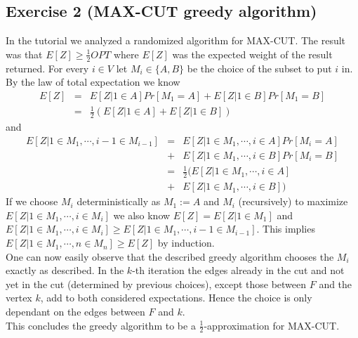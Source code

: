 \subsection*{Exercise 2 \mdseries (MAX-CUT greedy algorithm)}

In the tutorial we analyzed a randomized algorithm for MAX-CUT. The result was that $E[Z] \geq \frac{1}{2}OPT$ where $E[Z]$ was the expected weight of the result returned.
For every $i \in V$ let $M_i \in \{A,B\}$ be the choice of the subset to put $i$ in. By the law of total expectation we know
$$
\begin{array}{rcl}
E[Z] & = & E[Z | 1 \in A]Pr[M_1 = A] + E[Z | 1 \in B]Pr[M_1 = B] \\
& = & \frac{1}{2}(E[Z | 1 \in A] + E[Z | 1 \in B])
\end{array}
$$
and
$$
\begin{array}{rcl}
E[Z | 1 \in M_1, \cdots, i - 1 \in M_{i-1}] & = & E[Z | 1 \in M_1, \cdots, i \in A]Pr[M_i = A] \\
& + & E[Z | 1 \in M_1, \cdots, i \in B]Pr[M_i = B] \\
& = & \frac{1}{2}(E[Z | 1 \in M_1, \cdots, i \in A] \\
& + & E[Z | 1 \in M_1, \cdots, i \in B])
\end{array}
$$
If we choose $M_i$ deterministically as $M_1 := A$ and $M_i$ (recursively) to maximize $E[Z | 1 \in M_1, \cdots, i \in M_{i}]$ we also know $E[Z] = E[Z | 1 \in M_1]$ and $E[Z | 1 \in M_1, \cdots, i \in M_{i}] \geq E[Z | 1 \in M_1, \cdots, i - 1 \in M_{i-1}]$. This implies $E[Z | 1 \in M_1, \cdots, n \in M_{n}] \geq E[Z]$ by induction.\\
One can now easily observe that the described greedy algorithm chooses the $M_i$ exactly as described. In the $k$-th iteration the edges already in the cut and not yet in the cut (determined by previous choices), except those between $F$ and the vertex $k$, add to both considered expectations. Hence the choice is only dependant on the edges between $F$ and $k$.\\
This concludes the greedy algorithm to be a $\frac{1}{2}$-approximation for MAX-CUT.

